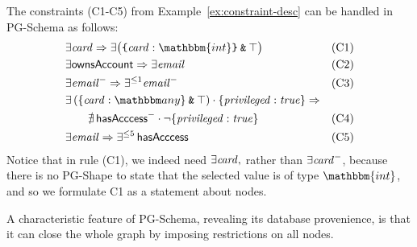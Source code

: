 \begin{example}\label{ex:sharedExamplesPGS} The constraints (C1-C5) from Example~\ref{ex:constraint-desc} can be handled in PG-Schema as follows: 
\begin{align*}
& \exists \excard \Rightarrow  \exists \big ( \closedRT{\excard : \mathbbm{int}}\tAnd \top \big )  & \mbox{(C1)} \\
&  \exists \exowns\Rightarrow \exists \exemail  & \mbox{(C2)} \\
&  \exists\exemail^{-}  \Rightarrow \exists^{\leq 1} \exemail^{-} & \mbox{(C3)} \\
& \exists\, (\{ \excard : \any  \} \tAnd \top) \cdot  \{\exprivileged :\mathit{true} \} \Rightarrow  & \\ &   \qquad  
\nexists \,\exaccess^{-} \cdot \neg \{\exprivileged :\mathit{true}\} & \mbox{(C4)} \\
& \exists \exemail \Rightarrow \exists ^{\leq 5} \, \exaccess & \mbox{(C5)} 
\end{align*}
Notice that in rule (C1), we indeed need $\exists \mathit{card},$ rather than $\exists \mathit{card}^{-}$, because there is no PG-Shape to state that the selected value is of type $\mathbbm{int}$, and so we formulate C1 as a statement about nodes.
\end{example}



A characteristic feature of PG-Schema, revealing its database provenience, is that it can close the whole graph by imposing restrictions on all nodes.

